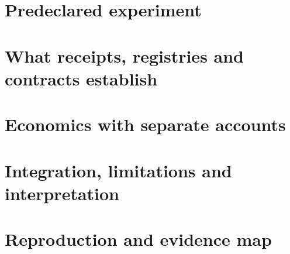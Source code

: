 \documentclass[11pt]{article}
\begin{document}
\section{Predeclared experiment}

\section{What receipts, registries and contracts establish}

\section{Economics with separate accounts}

\clearpage
\section{Integration, limitations and interpretation}


\clearpage
\appendix
\section{Reproduction and evidence map}


\clearpage


\end{document}
